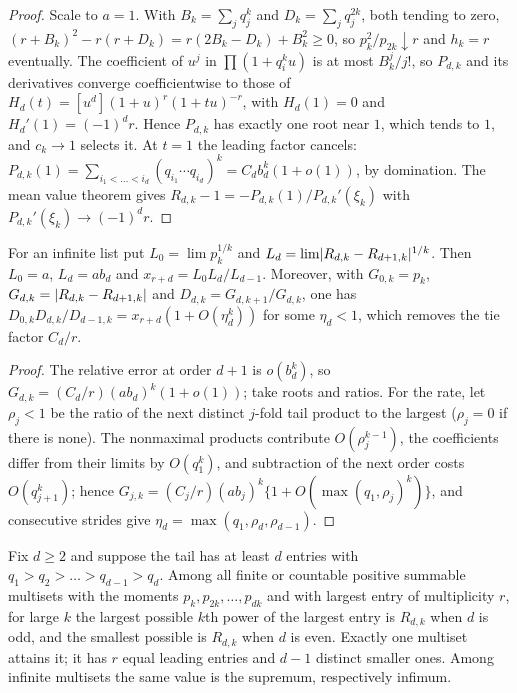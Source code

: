 \begin{proof}
Scale to $a=1$. With $B_k=\sum_jq_j^k$ and $D_k=\sum_jq_j^{2k}$, both tending to zero,
$(r+B_k)^2-r(r+D_k)=r(2B_k-D_k)+B_k^2\ge0$, so $p_k^2/p_{2k}\downarrow r$ and $h_k=r$ eventually.
The coefficient of $u^j$ in $\prod(1+q_i^ku)$ is at most $B_k^j/j!$, so $P_{d,k}$ and its derivatives
converge coefficientwise to those of $H_d(t)=[u^d](1+u)^r(1+tu)^{-r}$, with $H_d(1)=0$ and
$H_d'(1)=(-1)^dr$. Hence $P_{d,k}$ has exactly one root near $1$, which tends to $1$, and $c_k\to1$
selects it. At $t=1$ the leading factor cancels:
$P_{d,k}(1)=\sum_{i_1<\dots<i_d}(q_{i_1}\cdots q_{i_d})^k=C_db_d^k(1+o(1))$, by domination. The mean
value theorem gives $R_{d,k}-1=-P_{d,k}(1)/P_{d,k}'(\xi_k)$ with $P_{d,k}'(\xi_k)\to(-1)^dr$.
\end{proof}

\begin{corollary}\label{rec:cor:successive}
For an infinite list put $L_0=\lim p_k^{1/k}$ and $L_d=\lim\lvert R_{d,k}-R_{d+1,k}\rvert^{1/k}$. Then
$L_0=a$, $L_d=ab_d$ and $x_{r+d}=L_0L_d/L_{d-1}$. Moreover, with $G_{0,k}=p_k$,
$G_{d,k}=\lvert R_{d,k}-R_{d+1,k}\rvert$ and $D_{d,k}=G_{d,k+1}/G_{d,k}$, one has
$D_{0,k}D_{d,k}/D_{d-1,k}=x_{r+d}(1+O(\eta_d^k))$ for some $\eta_d<1$, which removes the tie factor
$C_d/r$.
\end{corollary}

\begin{proof}
The relative error at order $d+1$ is $o(b_d^k)$, so $G_{d,k}=(C_d/r)(ab_d)^k(1+o(1))$; take roots
and ratios. For the rate, let $\rho_j<1$ be the ratio of the next distinct $j$-fold tail product to
the largest ($\rho_j=0$ if there is none). The nonmaximal products contribute $O(\rho_j^{k-1})$, the
coefficients differ from their limits by $O(q_1^k)$, and subtraction of the next order costs
$O(q_{j+1}^k)$; hence $G_{j,k}=(C_j/r)(ab_j)^k\{1+O(\max(q_1,\rho_j)^k)\}$, and consecutive strides
give $\eta_d=\max(q_1,\rho_d,\rho_{d-1})$.
\end{proof}

\begin{theorem}\label{rec:thm:sharpendpoint}
Fix $d\ge2$ and suppose the tail has at least $d$ entries with $q_1>q_2>\dots>q_{d-1}>q_d$. Among
all finite or countable positive summable multisets with the moments $p_k,p_{2k},\dots,p_{dk}$ and
with largest entry of multiplicity $r$, for large $k$ the largest possible $k$th power of the
largest entry is $R_{d,k}$ when $d$ is odd, and the smallest possible is $R_{d,k}$ when $d$ is even.
Exactly one multiset attains it; it has $r$ equal leading entries and $d-1$ distinct smaller ones.
Among infinite multisets the same value is the supremum, respectively infimum.
\end{theorem}

